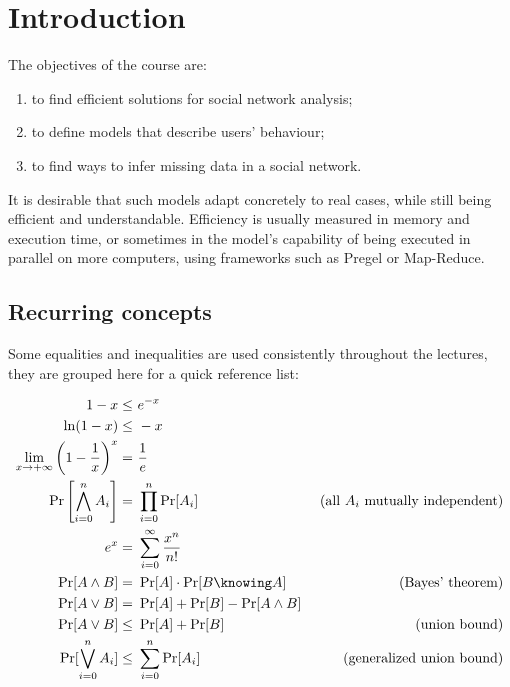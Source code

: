 \chapter{Introduction}
    
The objectives of the course are:
\begin{enumerate}
    \item to find efficient solutions for social network analysis;
    \item to define models that describe users' behaviour;
    \item to find ways to infer missing data in a social network.
\end{enumerate}

It is desirable that such models adapt concretely to real cases, while still being efficient and understandable. Efficiency is usually measured in memory and execution time, or sometimes in the model's capability of being executed in parallel on more computers, using frameworks such as Pregel or Map-Reduce.


\section{Recurring concepts}

Some equalities and inequalities are used consistently throughout the lectures, they are grouped here for a quick reference list: 

\begin{align}
    1 - x \leq&\ e^{-x}                                                 & \label{eq:e-x}                                    \\
    \ln(1 - x) \leq&\ -x                                                & \label{eq:ln-1-x}                                 \\
    \lim_{x \to +\infty} \left(1 - \frac{1}{x}\right)^x =&\ \frac{1}{e} & \label{eq:limit-1/e}                              \\
    \Pr\left[\bigwedge_{i=0}^n A_i\right] =&\ \prod_{i=0}^{n}\Pr[A_i]   & \text{(all } A_i \text{ mutually independent)}    \label{eq:prob} \\
    e^x =&\ \sum_{i = 0}^{\infty} \frac{x^n}{n!}                        & \label{eq:epow}                                   \\
    \Pr[A \wedge B] =&\ \Pr[A] \cdot \Pr[B \knowing A]                  & \tag{Bayes' theorem}                              \label{eq-bayes} \\
    \Pr[A \vee B] =&\ \Pr[A] + \Pr[B] - \Pr[A \wedge B]                 & \label{eq:prob-or}                                \\
    \Pr[A \vee B] \leq&\ \Pr[A] + \Pr[B]                                & \tag{union bound}                                 \label{eq:union-bound} \\
    \Pr[\bigvee_{i = 0}^n A_i] \leq&\ \sum_{i = 0}^{n}\Pr[A_i]          & \tag{generalized union bound}                     \label{eq:union-bound-gen} \\
\end{align}

